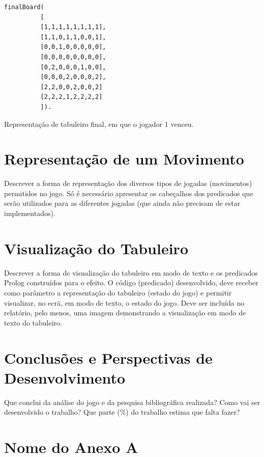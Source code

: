 \documentclass[15pt,a4paper]{article}
\begin{document}
\begin{code}[H]
	\begin{verbatim}
finalBoard(
		  [
		  [1,1,1,1,1,1,1,1],
		  [1,1,0,1,1,0,0,1],
		  [0,0,1,0,0,0,0,0],
		  [0,0,0,0,0,0,0,0],
		  [0,2,0,0,0,1,0,0],
		  [0,0,0,2,0,0,0,2],
		  [2,2,0,0,2,0,0,2]
		  [2,2,2,1,2,2,2,2]
		  ]).
\end{verbatim}
\caption{Representação de tabuleiro final, em que o jogador 1 venceu.}
\end{code}

\section{Representação de um Movimento}
Descrever a forma de representação dos diversos tipos de jogadas (movimentos) permitidos no jogo. Só é necessário apresentar os cabeçalhos dos predicados que serão utilizados para as diferentes jogadas (que ainda não precisam de estar implementados).

\section{Visualização do Tabuleiro}
Descrever a forma de visualização do tabuleiro em modo de texto e os predicados Prolog construídos para o efeito. O código (predicado) desenvolvido, deve receber como parâmetro a representação do tabuleiro (estado do jogo) e permitir visualizar, no ecrã, em modo de texto, o estado do jogo. Deve ser incluída no relatório, pelo menos, uma imagem demonstrando a visualização em modo de texto do tabuleiro.

\section{Conclusões e Perspectivas de Desenvolvimento}
Que conclui da análise do jogo e da pesquisa bibliográfica realizada? Como vai ser desenvolvido o trabalho? Que parte (\%) do trabalho estima que falta fazer?

\clearpage
{}
\renewcommand\refname{Bibliografia}





\newpage
\appendix
\section{Nome do Anexo A}
\end{document}
